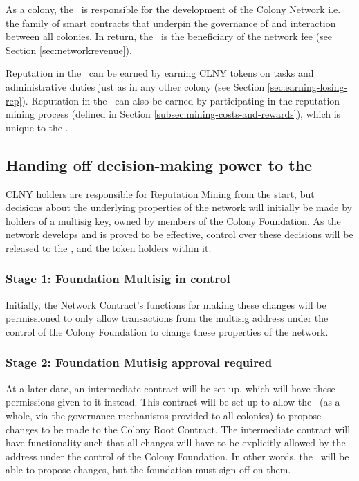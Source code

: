 As a colony, the \rc\ is responsible for the development of the Colony Network i.e. the family of smart contracts that underpin the governance of and interaction between all colonies. In return, the \rc\ is the beneficiary of the network fee (see Section \ref{sec:networkrevenue}).

Reputation in the \rc\ can be earned by earning CLNY tokens on tasks and administrative duties just as in any other colony (see Section \ref{sec:earning-losing-rep}). Reputation in the \rc\ can also be earned by participating in the reputation mining process (defined in Section \ref{subsec:mining-costs-and-rewards}), which is unique to the \rc.

\subsection{Handing off decision-making power to the \rc}\label{subsec:ceding-control-to-rc}
CLNY holders are responsible for Reputation Mining from the start, but decisions about the underlying properties of the network will initially be made by holders of a multisig key, owned by members of the Colony Foundation. As the network develops and is proved to be effective, control over these decisions will be released to the \rc, and the token holders within it.

\subsubsection*{Stage 1: Foundation Multisig in control}
Initially, the Network Contract's functions for making these changes will be permissioned to only allow transactions from the multisig address under the control of the Colony Foundation to change these properties of the network. 

\subsubsection*{Stage 2: Foundation Mutisig approval required}
At a later date, an intermediate contract will be set up, which will have these permissions given to it instead. This contract will be set up to allow the \rc\ (as a whole, via the governance mechanisms provided to all colonies) to propose changes to be made to the Colony Root Contract. The intermediate contract will have functionality such that all changes will have to be explicitly allowed by the address under the control of the Colony Foundation. In other words, the \rc\ will be able to propose changes, but the foundation must sign off on them.

